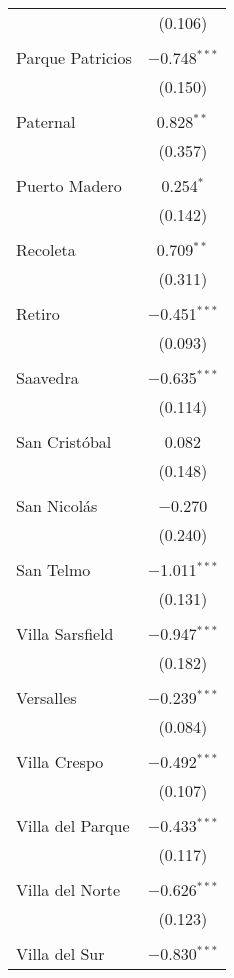 \begin{table}[!htbp]
\begin{tabular}{@{\extracolsep{5pt}}lc}
  & (0.106) \\ 
  & \\ 
 Parque Patricios & $-$0.748$^{***}$ \\ 
  & (0.150) \\ 
  & \\ 
 Paternal & 0.828$^{**}$ \\ 
  & (0.357) \\ 
  & \\ 
 Puerto Madero & 0.254$^{*}$ \\ 
  & (0.142) \\ 
  & \\ 
 Recoleta & 0.709$^{**}$ \\ 
  & (0.311) \\ 
  & \\ 
 Retiro & $-$0.451$^{***}$ \\ 
  & (0.093) \\ 
  & \\ 
 Saavedra & $-$0.635$^{***}$ \\ 
  & (0.114) \\ 
  & \\ 
 San Cristóbal & 0.082 \\ 
  & (0.148) \\ 
  & \\ 
 San Nicolás & $-$0.270 \\ 
  & (0.240) \\ 
  & \\ 
 San Telmo & $-$1.011$^{***}$ \\ 
  & (0.131) \\ 
  & \\ 
 Villa Sarsfield & $-$0.947$^{***}$ \\ 
  & (0.182) \\ 
  & \\ 
 Versalles & $-$0.239$^{***}$ \\ 
  & (0.084) \\ 
  & \\ 
 Villa Crespo & $-$0.492$^{***}$ \\ 
  & (0.107) \\ 
  & \\ 
 Villa del Parque & $-$0.433$^{***}$ \\ 
  & (0.117) \\ 
  & \\ 
 Villa del Norte & $-$0.626$^{***}$ \\ 
  & (0.123) \\ 
  & \\ 
 Villa del Sur & $-$0.830$^{***}$ \\ 

\end{tabular}
\end{table}
